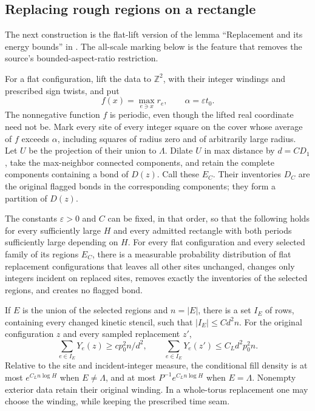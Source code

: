\subsection{Replacing rough regions on a rectangle}
\label{subsec:comparison-edits}

The next construction is the flat-lift version of the lemma
``Replacement and its energy bounds'' in
\cite[Lemma~7.4 and Equations~(7.7)--(7.8), subsection
``Regions that can be replaced at an energy gain'']{O3Continuum}.
The all-scale marking below is the feature that removes the source's
bounded-aspect-ratio restriction.

For a flat configuration, lift the data to \(\mathbb Z^2\), with their
integer windings and prescribed sign twists, and put
\[
 f(x)=\max_{e\ni x}r_e,\qquad \alpha=\varepsilon t_0.
\]
The nonnegative function \(f\) is periodic, even though the lifted real
coordinate need not be.  Mark every site of every integer square on the
cover whose average of \(f\) exceeds \(\alpha\), including squares of
radius zero and of arbitrarily large radius.  Let \(U\) be the projection
of their union to \(\Lambda\).  Dilate \(U\) in max distance by
\(d=CD_1\), take the max-neighbor connected components, and retain the
complete components containing a bond of \(D(z)\).  Call these \(E_C\).
Their inventories \(D_C\) are the original flagged bonds in the corresponding
components; they form a partition of \(D(z)\).

\begin{lemma}
\label{lem:comparison-flat-edits}
The constants \(\varepsilon>0\) and \(C\) can be fixed, in that order,
so that the following holds for every sufficiently large \(H\) and every
admitted rectangle with both periods sufficiently large depending on
\(H\).  For every flat configuration and every selected family of its
regions \(E_C\), there is a measurable probability distribution of flat
replacement configurations that leaves all other sites unchanged, changes
only integers incident on replaced sites, removes exactly the inventories
of the selected regions, and creates no flagged bond.

If \(E\) is the union of the selected regions and \(n=|E|\), there is a
set \(I_E\) of rows, containing every changed kinetic stencil, such that
\( |I_E|\le C d^2n\).  For the original configuration \(z\) and every
sampled replacement \(z'\),
\begin{equation}
 \sum_{e\in I_E}Y_e(z)\ge cp_0^2n/d^2,
 \qquad
 \sum_{e\in I_E}Y_e(z')\le C_Ld^2p_0^2n.
 \label{eq:comparison-edit-energy}
\end{equation}
Relative to the site and incident-integer measure, the conditional fill
density is at most \(e^{C_Ln\log H}\) when \(E\ne\Lambda\), and at most
\(P^{-1}e^{C_Ln\log H}\) when \(E=\Lambda\).  Nonempty exterior data
retain their original winding.  In a whole-torus replacement one may
choose the winding, while keeping the prescribed time seam.
\end{lemma}

